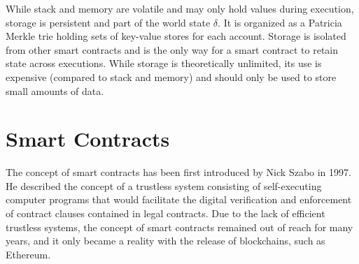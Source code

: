         While stack and memory are volatile and may only hold values during execution, storage is persistent and part of the world state $\delta$.
        It is organized as a Patricia Merkle trie holding sets of key-value stores for each account.
        Storage is isolated from other smart contracts and is the only way for a smart contract to retain state across executions.
        While storage is theoretically unlimited, its use is expensive (compared to stack and memory) and should only be used to store small amounts of data.

\section{Smart Contracts}
    The concept of smart contracts has been first introduced by Nick Szabo in 1997. He described the concept of a trustless system consisting of self-executing computer programs that would facilitate the digital verification and enforcement of contract clauses contained in legal contracts.
    Due to the lack of efficient trustless systems, the concept of smart contracts remained out of reach for many years, and it only became a reality with the release of blockchains, such as Ethereum.

